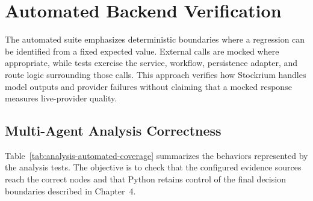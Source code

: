 \section{Automated Backend Verification}
\label{sec:automated-backend-verification}

The automated suite emphasizes deterministic boundaries where a regression can be identified from a fixed expected value. External calls are mocked where appropriate, while tests exercise the service, workflow, persistence adapter, and route logic surrounding those calls. This approach verifies how Stockrium handles model outputs and provider failures without claiming that a mocked response measures live-provider quality.

\subsection{Multi-Agent Analysis Correctness}
\label{subsec:multi-agent-analysis-correctness}

Table~\ref{tab:analysis-automated-coverage} summarizes the behaviors represented by the analysis tests. The objective is to check that the configured evidence sources reach the correct nodes and that Python retains control of the final decision boundaries described in Chapter~4.

